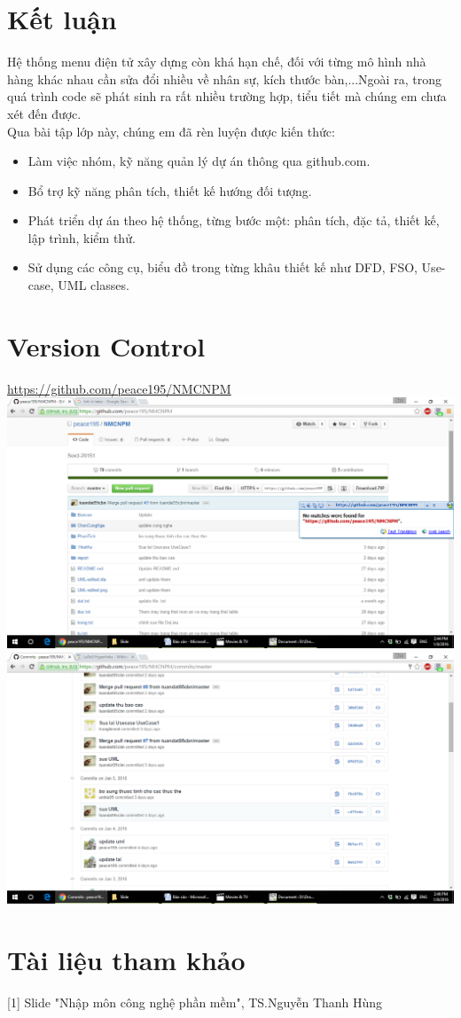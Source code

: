 \documentclass[a4paper,12pt]{report}
\begin{document}
\chapter{Kết luận}
Hệ thống menu điện tử xây dựng còn khá hạn chế, đối với từng mô hình nhà hàng khác nhau cần sửa đổi nhiều về nhân sự, kích thước bàn,...Ngoài ra, trong quá trình code sẽ phát sinh ra rất nhiều trường hợp, tiểu tiết mà chúng em chưa xét đến được.\\

Qua bài tập lớp này, chúng em đã rèn luyện được kiến thức:
\begin{itemize}
	\item Làm việc nhóm, kỹ năng quản lý dự án thông qua github.com.
	\item Bổ trợ kỹ năng phân tích, thiết kế hướng đối tượng.
	\item Phát triển dự án theo hệ thống, từng bước một: phân tích, đặc tả, thiết kế, lập trình, kiểm thử. 
	\item Sử dụng các công cụ, biểu đồ trong từng khâu thiết kế như DFD, FSO, Use-case, UML classes.
\end{itemize}


\chapter{Version Control}
\begin{center}
\hyperref[label_name]{https://github.com/peace195/NMCNPM}\\
\includegraphics[scale=0.4]{vc1.png}\\
\includegraphics[scale=0.4]{vc2.png}
\end{center}
\chapter*{Tài liệu tham khảo}
{}
[1] Slide "Nhập môn công nghệ phần mềm", TS.Nguyễn Thanh Hùng
\end{document}

